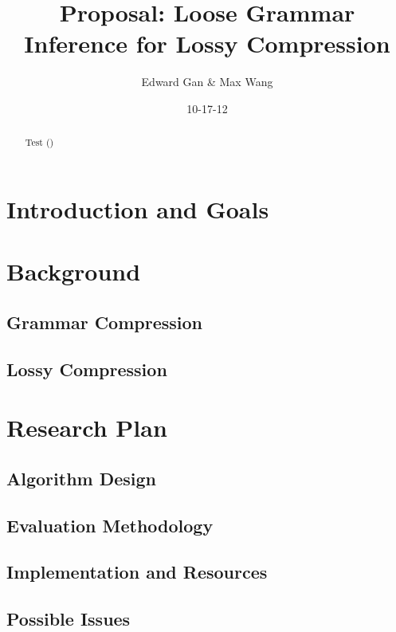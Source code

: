 \documentclass[11pt]{article}
\begin{document}


\title{Proposal: Loose Grammar Inference for Lossy Compression}
\author{Edward Gan \& Max Wang}
\date{10-17-12}
\maketitle

\begin{abstract}
Test (\cite{sequitur})
\end{abstract}

\section{Introduction and Goals}

\section{Background}

\subsection{Grammar Compression}

\subsection{Lossy Compression}

\section{Research Plan}

\subsection{Algorithm Design}

\subsection{Evaluation Methodology}

\subsection{Implementation and Resources}

\subsection{Possible Issues}


\end{document}

